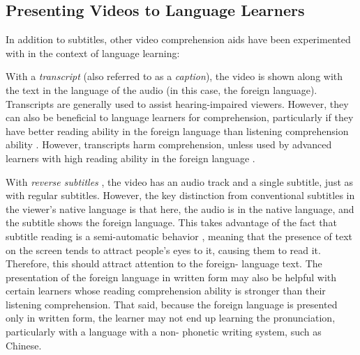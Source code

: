 \documentclass{sigchi}
\begin{document}
\subsection{Presenting Videos to Language Learners}


In addition to subtitles, other video comprehension aids have been experimented with in the context of language learning:

With a \emph{transcript} (also referred to as a \emph{caption}), the video is shown along with the text in the
language of the audio (in this case, the foreign language). Transcripts are generally used to
assist hearing-impaired viewers. However, they can also be beneficial to language learners for
comprehension, particularly if they have better reading ability in the foreign language than
listening comprehension ability \cite{danan2004captioning}. However, transcripts harm comprehension, unless used by advanced
learners with high reading ability in the foreign language \cite{bianchi2008captions}.

With \emph{reverse subtitles} \cite{danan1992reversed}, the video has an audio track and a single subtitle, just as with regular
subtitles. However, the key distinction from conventional subtitles in the viewer's native language is that here, the audio is in the native language, and
the subtitle shows the foreign language. This takes advantage of the fact that subtitle reading is
a semi-automatic behavior \cite{d2002foreign}, meaning that the presence of text on the screen tends to attract
people's eyes to it, causing them to read it. Therefore, this should attract attention to the foreign-
language text. The presentation of the foreign language in written form may also be helpful with
certain learners whose reading comprehension ability is stronger than their listening
comprehension. That said, because the foreign language is presented only in written form, the
learner may not end up learning the pronunciation, particularly with a language with a non-
phonetic writing system, such as Chinese.
\end{document}
